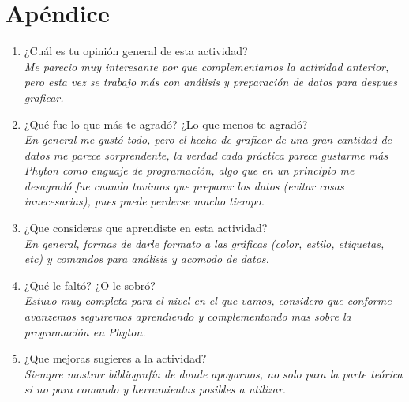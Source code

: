 \documentclass[12pt]{article}
\begin{document}
\section*{Apéndice}
\begin{enumerate}
\item ¿Cuál es tu opinión general de esta actividad?\\
\textit{Me parecio muy interesante por que complementamos la actividad anterior, pero esta vez se trabajo más con análisis y preparación de datos para despues graficar.}
\item ¿Qué fue lo que más te agradó? ¿Lo que menos te agradó?\\
\textit{En general me gustó todo, pero el hecho de graficar de una gran cantidad de datos me parece sorprendente, la verdad cada práctica parece gustarme más Phyton como enguaje de programación, algo que en un principio me desagradó fue cuando tuvimos que preparar los datos (evitar cosas innecesarias), pues puede perderse mucho tiempo.}
\item ¿Que consideras que aprendiste en esta actividad? \\
\textit{En general, formas de darle formato a las gráficas (color, estilo, etiquetas, etc) y comandos para análisis y acomodo de datos.}
\item ¿Qué le faltó? ¿O le sobró? \\
\textit{Estuvo muy completa para el nivel en el que vamos, considero que conforme avanzemos seguiremos aprendiendo y complementando mas sobre la programación en Phyton.}
\item ¿Que mejoras sugieres a la actividad?\\
\textit{Siempre mostrar bibliografía de donde apoyarnos, no solo para la parte teórica si no para comando y herramientas posibles a utilizar}.
\end{enumerate}
\end{document}
